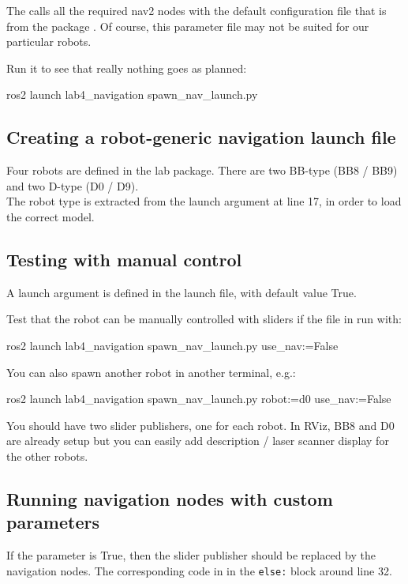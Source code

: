 \documentclass{ecnreport}
\begin{document}
The  calls all the required nav2 nodes with the default configuration file that is  from the package . Of course, this parameter file may not be suited for our particular robots.

Run it to see that really nothing goes as planned:
\begin{bashcodelarge}
 ros2 launch lab4_navigation spawn_nav_launch.py
\end{bashcodelarge}

\subsection{Creating a robot-generic navigation launch file}

Four robots are defined in the lab package. There are two BB-type (BB8 / BB9) and two D-type (D0 / D9).\\
The robot type is extracted from the  launch argument at line 17, in order to load the correct model.

\subsection{Testing with manual control}

A launch argument  is defined in the launch file, with default value True.

Test that the robot can be manually controlled with sliders if the file in run with:
\begin{bashcodelarge}
 ros2 launch lab4_navigation spawn_nav_launch.py use_nav:=False
\end{bashcodelarge}

You can also spawn another robot in another terminal, e.g.:
\begin{bashcodelarge}
 ros2 launch lab4_navigation spawn_nav_launch.py robot:=d0 use_nav:=False
\end{bashcodelarge}
You should have two slider publishers, one for each robot. In RViz, BB8 and D0 are already setup but you can easily add description / laser scanner display for the other robots.

\subsection{Running navigation nodes with custom parameters}

If the parameter  is True, then the slider publisher should be replaced by the navigation nodes. The corresponding code in in the \texttt{else:} block around line 32.
\end{document}
